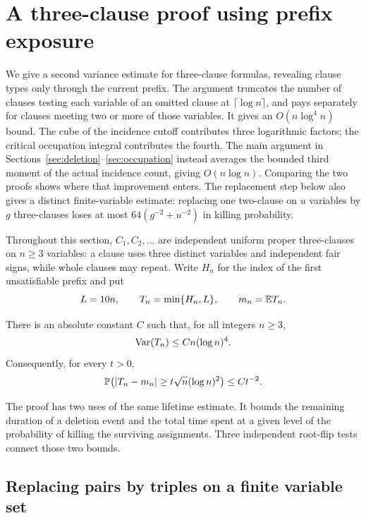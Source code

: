 \section{A three-clause proof using prefix exposure}\label{sec:appendix-c}
\label{sec:prefix-exposure}

We give a second variance estimate for three-clause formulas, revealing
clause types only through the current prefix.  The argument truncates the
number of clauses testing each variable of an omitted clause at
\(\lceil\log n\rceil\), and pays separately for clauses meeting two or
more of those variables.  It gives an \(O(n\log^4 n)\) bound.  The
cube of the incidence cutoff contributes three logarithmic factors;
the critical occupation integral contributes the fourth.  The main
argument in Sections~\ref{sec:deletion}--\ref{sec:occupation} instead
averages the bounded third moment of the actual incidence count, giving
\(O(n\log n)\).  Comparing the two proofs shows where that improvement
enters.  The replacement step below also gives a distinct finite-variable
estimate: replacing one two-clause on \(u\) variables by \(g\)
three-clauses loses at most \(64(g^{-2}+u^{-2})\) in killing probability.

Throughout this section, \(C_1,C_2,\ldots\) are independent uniform
proper three-clauses on \(n\ge3\) variables: a clause uses three distinct
variables and independent fair signs, while whole clauses may repeat.
Write \(H_n\) for the index of the first unsatisfiable prefix and put
\[
 L=10n,\qquad T_n=\min\{H_n,L\},\qquad m_n=\mathbb E T_n.
\]

\begin{theorem}\label{thm:prefix-variance}
There is an absolute constant \(C\) such that, for all integers \(n\ge3\),
\[
 \operatorname{Var}(T_n)\le Cn(\log n)^4.
\]
Consequently, for every \(t>0\),
\[
 \mathbb P\bigl(|T_n-m_n|\ge t\sqrt n(\log n)^2\bigr)\le Ct^{-2}.
\]
\end{theorem}

The proof has two uses of the same lifetime estimate.  It bounds the
remaining duration of a deletion event and the total time spent at a
given level of the probability of killing the surviving assignments.
Three independent root-flip tests connect those two bounds.

\subsection{Replacing pairs by triples on a finite variable set}

